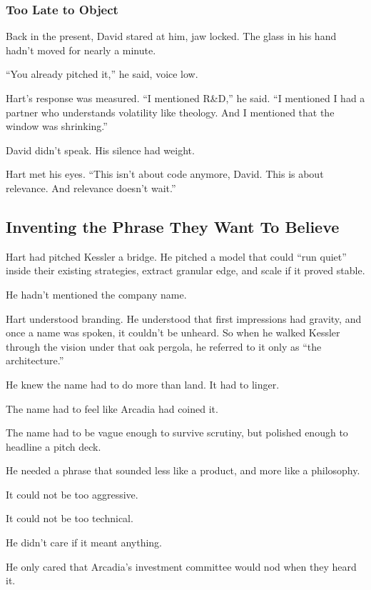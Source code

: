 \medskip

\subsubsection{Too Late to Object}

Back in the present, David stared at him, jaw locked. The glass in his hand hadn’t moved for nearly a minute.

“You already pitched it,” he said, voice low.

Hart’s response was measured. “I mentioned R\&D,” he said. “I mentioned I had a partner who understands 
volatility like theology. And I mentioned that the window was shrinking.”

David didn’t speak. His silence had weight.

Hart met his eyes. “This isn’t about code anymore, David. This is about relevance. And relevance doesn’t wait.”


\subsection{Inventing the Phrase They Want To Believe}

Hart had pitched Kessler a bridge.
He pitched a model that could “run quiet” inside their existing strategies, extract granular edge, and scale 
if it proved stable.

He hadn’t mentioned the company name.

Hart understood branding. He understood that first impressions had gravity, and once a name was spoken, it couldn’t 
be unheard.
So when he walked Kessler through the vision under that oak pergola, he referred to it only as “the architecture.”

He knew the name had to do more than land. It had to linger.

The name had to feel like Arcadia had coined it.

The name had to be vague enough to survive scrutiny, but polished enough to headline a pitch deck.

He needed a phrase that sounded less like a product, and more like a philosophy.

It could not be too aggressive.  

It could not be too technical.  

He didn’t care if it meant anything.

He only cared that Arcadia’s investment committee would nod when they heard it.

